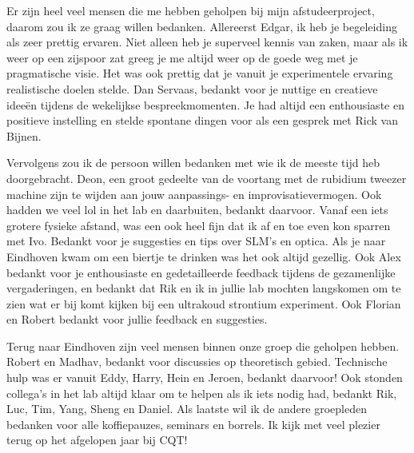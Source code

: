 \noindent Er zijn heel veel mensen die me hebben geholpen bij mijn afstudeerproject, daarom zou ik ze graag willen bedanken. 
Allereerst Edgar, ik heb je begeleiding als zeer prettig ervaren. 
Niet alleen heb je superveel kennis van zaken, maar als ik weer op een zijspoor zat greeg je me altijd weer op de goede weg met je pragmatische visie. 
Het was ook prettig dat je vanuit je experimentele ervaring realistische doelen stelde.
Dan Servaas, bedankt voor je nuttige en creatieve ideeën tijdens de wekelijkse bespreekmomenten. 
Je had altijd een enthousiaste en positieve instelling en stelde spontane dingen voor als een gesprek met Rick van Bijnen.

Vervolgens zou ik de persoon willen bedanken met wie ik de meeste tijd heb doorgebracht.
Deon, een groot gedeelte van de voortang met de rubidium tweezer machine zijn te wijden aan jouw aanpassings- en improvisatievermogen. Ook hadden we veel lol in het lab en daarbuiten, bedankt daarvoor. 
Vanaf een iets grotere fysieke afstand, was een ook heel fijn dat ik af en toe even kon sparren met Ivo. 
Bedankt voor je suggesties en tips over SLM's en optica. Als je naar Eindhoven kwam om een biertje te drinken was het ook altijd gezellig.
Ook Alex bedankt voor je enthousiaste en gedetailleerde feedback tijdens de gezamenlijke vergaderingen, en bedankt dat Rik en ik in jullie lab mochten langskomen om te zien wat er bij komt kijken bij een ultrakoud strontium experiment. 
Ook Florian en Robert bedankt voor jullie feedback en suggesties.

Terug naar Eindhoven zijn veel mensen binnen onze groep die geholpen hebben. 
Robert en Madhav, bedankt voor discussies op theoretisch gebied. 
Technische hulp was er vanuit Eddy, Harry, Hein en Jeroen, bedankt daarvoor! 
Ook stonden collega's in het lab altijd klaar om te helpen als ik iets nodig had, bedankt Rik, Luc, Tim, Yang, Sheng en Daniel. 
Als laatste wil ik de andere groepleden bedanken voor alle koffiepauzes, seminars en borrels. 
Ik kijk met veel plezier terug op het afgelopen jaar bij CQT! 
